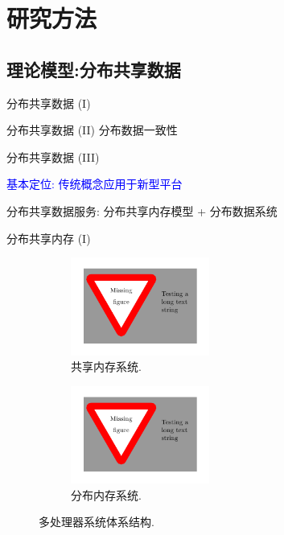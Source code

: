 \section{研究方法}

\subsection{理论模型:分布共享数据}

\begin{frame}{分布共享数据 (I)}
\end{frame}
\begin{frame}{分布共享数据 (II)}
  分布数据一致性
\end{frame}
\begin{frame}{分布共享数据 (III)}
  \begin{center}
    \textcolor{blue}{\large 基本定位: 传统概念应用于新型平台}
  \end{center}

  \vspace{0.20cm}
  \begin{center}
    分布共享数据服务: 分布共享内存模型 + 分布数据系统
  \end{center}
\end{frame}
\begin{frame}{分布共享内存 (I)}
  \begin{figure}
    \begin{subfigure}{0.50\linewidth}
      \centering
      \includegraphics[width=0.50\textwidth]{figures/figure-placeholder.png}
      \caption{共享内存系统.}
    \end{subfigure}%
    \begin{subfigure}{0.50\linewidth}
      \centering
      \includegraphics[width=0.50\textwidth]{figures/figure-placeholder.png}
      \caption{分布内存系统.}
    \end{subfigure}
    \caption{多处理器系统体系结构.}
  \end{figure}
\end{frame}
